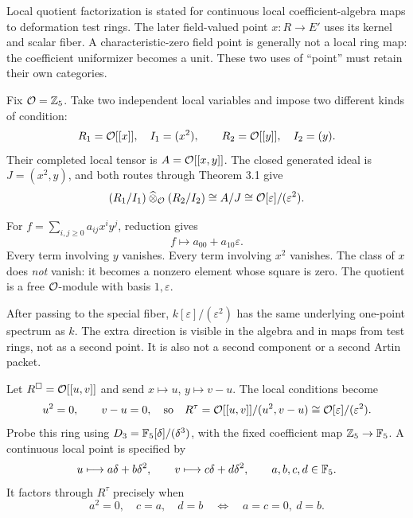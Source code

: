 Local quotient factorization is stated for continuous local coefficient-algebra maps to deformation test rings. The later field-valued point $x:R\to E'$ uses its kernel and scalar fiber. A characteristic-zero field point is generally not a local ring map: the coefficient uniformizer becomes a unit. These two uses of ``point'' must retain their own categories.

Fix $\mathcal O=\mathbb Z_5$. Take two independent local variables and impose two different kinds of condition:
\[
R_1=\mathcal O[[x]],\quad I_1=(x^2),\qquad
R_2=\mathcal O[[y]],\quad I_2=(y).
\]
Their completed local tensor is $A=\mathcal O[[x,y]]$. The closed generated ideal is $J=(x^2,y)$, and both routes through Theorem 3.1 give
\[
(R_1/I_1)\mathbin{\widehat\otimes}_{\mathcal O}(R_2/I_2)
\cong A/J
\cong \mathcal O[\varepsilon]/(\varepsilon^2).
\]


For $f=\sum_{i,j\ge0}a_{ij}x^iy^j$, reduction gives
\[
f\longmapsto a_{00}+a_{10}\varepsilon.
\]
Every term involving $y$ vanishes. Every term involving $x^2$ vanishes. The class of $x$ does \emph{not} vanish: it becomes a nonzero element whose square is zero. The quotient is a free $\mathcal O$-module with basis $1,\varepsilon$.

After passing to the special fiber, $k[\varepsilon]/(\varepsilon^2)$ has the same underlying one-point spectrum as $k$. The extra direction is visible in the algebra and in maps from test rings, not as a second point. It is also not a second component or a second Artin packet.


Let $R^\square=\mathcal O[[u,v]]$ and send $x\mapsto u$, $y\mapsto v-u$. The local conditions become
\[
u^2=0,\qquad v-u=0,
\quad\text{so}\quad
R^\tau=\mathcal O[[u,v]]/(u^2,v-u)\cong\mathcal O[\varepsilon]/(\varepsilon^2).
\]
Probe this ring using $D_3=\mathbb F_5[\delta]/(\delta^3)$, with the fixed coefficient map $\mathbb Z_5\to\mathbb F_5$. A continuous local point is specified by
\[
u\longmapsto a\delta+b\delta^2,\qquad
v\longmapsto c\delta+d\delta^2,
\qquad a,b,c,d\in\mathbb F_5.
\]
It factors through $R^\tau$ precisely when
\[
a^2=0,\quad c=a,\quad d=b
\quad\Longleftrightarrow\quad a=c=0,\ d=b.
\]


